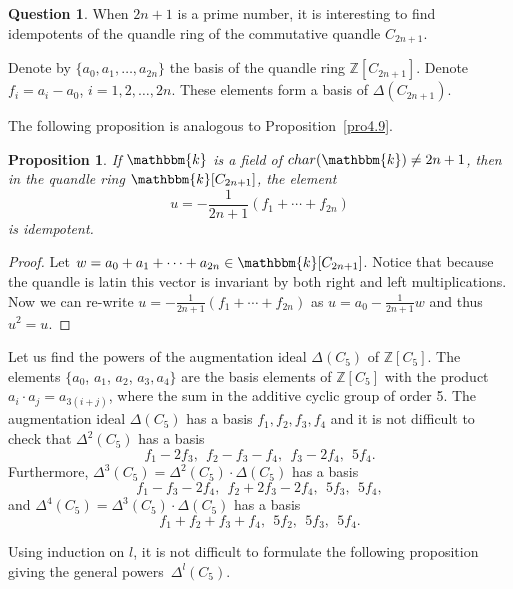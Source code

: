 \documentclass[12pt]{amsart}
\newtheorem{pro}[thm]{Proposition}
\theoremstyle{definition}
\newtheorem{qst}[thm]{Question}
\theoremstyle{remark}
\newcommand{\Z}{\mathbb{Z}}
\begin{document}
\medskip




\begin{qst}
When $2n+1$ is a prime number, it is interesting to find idempotents of the quandle ring of the commutative quandle $C_{2n+1}$. 
\end{qst}


 Denote by $\{ a_0, a_1, \ldots, a_{2n} \}$ the basis of the quandle ring $\Z[C_{2n+1}]$. Denote $f_i = a_i - a_0$, $i = 1, 2, \ldots , 2n$. These elements form a basis of 
 $ \Delta(C_{2n+1})$.
 
 
 The following proposition is analogous to Proposition~\ref{pro4.9}. 

\begin{pro}
If $\mathbbm {k}$ is a field of $char(\mathbbm {k}) \not=2n+1$, then in the quandle ring $\mathbbm {k}[C_{2n+1}]$, the element
$$
u = - \frac{1}{2n+1} \left( f_1 + \cdots + f_{2n}\right)
$$
is idempotent.
\end{pro}

\begin{proof}
Let $w=a_0+a_1+ \cdots+a_{2n} \in \mathbbm {k}[C_{2n+1}]$.  Notice that because the quandle is latin this vector is invariant by both right and left multiplications.
Now we can re-write $u = - \frac{1}{2n+1} \left( f_1 + \cdots + f_{2n}\right)$ as $u = a_0- \frac{1}{2n+1} w$ and thus $u^2=u$.
\end{proof}



Let us find the powers of the augmentation ideal $\Delta(C_5)$ of $\Z[C_5]$.  The elements  $\{ a_0$, $a_1$, $a_2$, $a_3, a_4 \}$ are the  basis elements of $\Z[C_5]$
 with the product $a_i \cdot a_j = a_{3(i+j)}$, where the sum in the additive cyclic group of order 5.
The augmentation ideal $\Delta(C_5)$ has a basis $f_1, f_2, f_3, f_4$ and  it is not difficult to check that  $\Delta^2(C_5)$ has a basis
$$
f_1 - 2 f_3,~~f_2 -  f_3 - f_4,~~f_3 - 2 f_4,~~5 f_4.
$$
Furthermore, $\Delta^3(C_5) = \Delta^2(C_5) \cdot \Delta(C_5)$ has a basis
$$
f_1 - f_3 - 2 f_4,~~f_2 + 2  f_3 - 2 f_4,~~5 f_3,~~5 f_4,
$$
and  $\Delta^4(C_5) = \Delta^3(C_5) \cdot \Delta(C_5)$ has a basis
$$
f_1 + f_2 +  f_3 + f_4,~~5 f_2,~~5 f_3,~~5 f_4.
$$

Using induction on $l$, it is not difficult to formulate the following proposition giving the general powers~$\Delta^l(C_5)$. 
\end{document}

